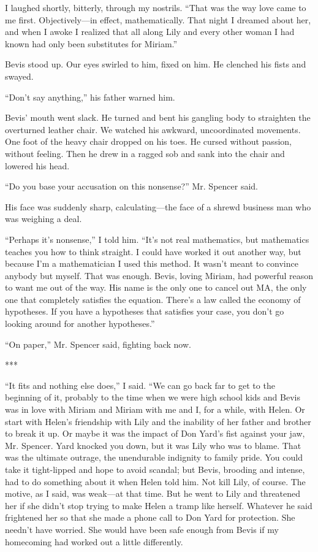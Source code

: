 {I laughed shortly, bitterly, through my nostrils. “That was the way love came to me first. Objectively—in effect, mathematically. That night I dreamed about her, and when I awoke I realized that all along Lily and every other woman I had known had only been substitutes for Miriam.”

Bevis stood up. Our eyes swirled to him, fixed on him. He clenched his fists and swayed.

“Don’t say anything,” his father warned him.

Bevis’ mouth went slack. He turned and bent his gangling body to straighten the overturned leather chair. We watched his awkward, uncoordinated movements. One foot of the heavy chair dropped on his toes. He cursed without passion, without feeling. Then he drew in a ragged sob and sank into the chair and lowered his head.

“Do you base your accusation on this nonsense?” Mr. Spencer said.

His face was suddenly sharp, calculating—the face of a shrewd business man who was weighing a deal.

“Perhaps it’s nonsense,” I told him. “It’s not real mathematics, but mathematics teaches you how to think straight. I could have worked it out another way, but because I’m a mathematician I used this method. It wasn’t meant to convince anybody but myself. That was enough. Bevis, loving Miriam, had powerful reason to want me out of the way. His name is the only one to cancel out MA, the only one that completely satisfies the equation. There’s a law called the economy of hypotheses. If you have a hypotheses that satisfies your case, you don’t go looking around for another hypotheses.”

“On paper,” Mr. Spencer said, fighting back now.

***

“It fits and nothing else does,” I said. “We can go back far to get to the beginning of it, probably to the time when we were high school kids and Bevis was in love with Miriam and Miriam with me and I, for a while, with Helen. Or start with Helen’s friendship with Lily and the inability of her father and brother to break it up. Or maybe it was the impact of Don Yard’s fist against your jaw, Mr. Spencer. Yard knocked you down, but it was Lily who was to blame. That was the ultimate outrage, the unendurable indignity to family pride. You could take it tight-lipped and hope to avoid scandal; but Bevis, brooding and intense, had to do something about it when Helen told him. Not kill Lily, of course. The motive, as I said, was weak—at that time. But he went to Lily and threatened her if she didn’t stop trying to make Helen a tramp like herself. Whatever he said frightened her so that she made a phone call to Don Yard for protection. She needn’t have worried. She would have been safe enough from Bevis if my homecoming had worked out a little differently.

}
